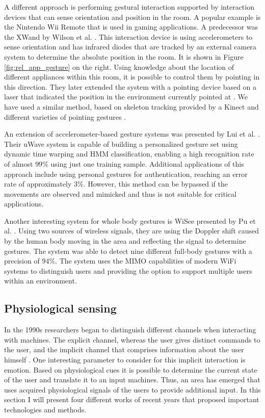 A different approach is performing gestural interaction supported by interaction devices that can sense orientation and position in the room. A popular example is the Nintendo Wii Remote that is used in gaming applications. A predecessor was the XWand by Wilson et al. \cite{Wilson2003}. This interaction device is using accelerometers to sense orientation and has infrared diodes that are tracked by an external camera system to determine the absolute position in the room. It is shown in Figure \ref{fig:rel_app_gesture} on the right. Using knowledge about the location of different appliances within this room, it is possible to control them by pointing in this direction. They later extended the system with a pointing device based on a laser that indicated the position in the environment currently pointed at \cite{Wilson2003a}. We have used a similar method, based on skeleton tracking provided by a Kinect and different varieties of pointing gestures \cite{majewski2013providing}.

An extension of accelerometer-based gesture systems was presented by Lui et al. \cite{liu2009uwave}. Their uWave system is capable of building a personalized gesture set using dynamic time warping and HMM classification, enabling a high recognition rate of almost $99\%$ using just one training sample. Additional applications of this approach include using personal gestures for authentication, reaching an error rate of approximately $3\%$. However, this method can be bypassed if the movements are observed and mimicked and thus is not suitable for critical applications.

Another interesting system for whole body gestures is WiSee presented by Pu et al. \cite{pu2013whole}. Using two sources of wireless signals, they are using the Doppler shift caused by the human body moving in the area and reflecting the signal to determine gestures. The system was able to detect nine different full-body gestures with a precision of $94\%$. The system uses the MIMO capabilities of modern WiFi systems to distinguish users and providing the option to support multiple users within an environment.

\subsection{Physiological sensing}
In the 1990s researchers began to distinguish different channels when interacting with machines. The explicit channel, whereas the user gives distinct commands to the user, and the implicit channel that comprises information about the user himself \cite{cowie2001emotion}. One interesting parameter to consider for this implicit interaction is emotion. Based on physiological cues it is possible to determine the current state of the user and translate it to an input machines. Thus, an area has emerged that uses acquired physiological signals of the users to provide additional input. In this section I will present four different works of recent years that proposed important technologies and methods.

